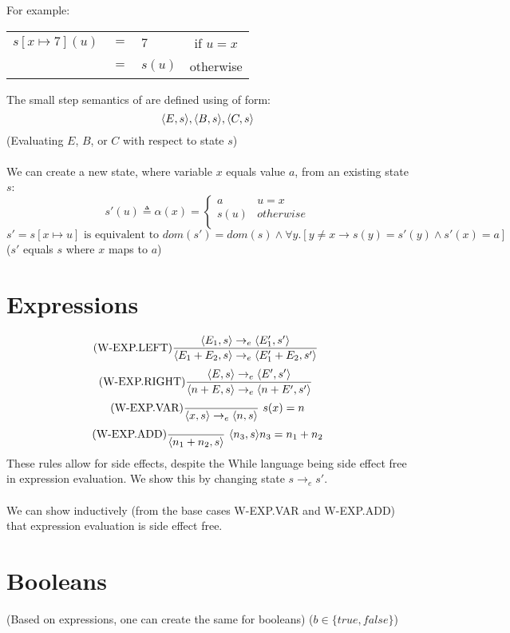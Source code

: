 \documentclass{report}
\begin{document}
        For example:
        \begin{center}
            \begin{tabular}{r c l c}
                $s[x \mapsto 7](u)$ & $=$ & $7$ & if $u = x$ \\
                & $=$ & $s(u)$ & otherwise \\
            \end{tabular}
        \end{center}
        The small step semantics of  are defined using  of form:
        \[\langle E, s \rangle, \langle B, s \rangle, \langle C, s \rangle \]
        (Evaluating $E$, $B$, or $C$ with respect to state $s$)
        \\
        \\ We can create a new state, where variable $x$ equals value $a$, from an existing state $s$:
        \[s'(u) \triangleq \alpha(x)=\begin{cases}
            a & u = x \\
            s(u) & otherwise \\
         \end{cases}\]
        \[s' = s[x \mapsto u] \text{ is equivalent to } dom(s') = dom(s) \land \forall y.[y \neq x \rightarrow s(y) = s'(y) \land s'(x) = a]\]
        ($s'$ equals $s$ where $x$ maps to $a$)
    
    \section*{Expressions}
        \[\text{(W-EXP.LEFT)}\dfrac{\langle E_1, s \rangle \to_e \langle E'_1, s' \rangle}{\langle E_1 + E_2, s \rangle \to_e \langle E'_1 + E_2, s' \rangle} \ \]
        \[\text{(W-EXP.RIGHT)}\dfrac{\langle E, s \rangle \to_e \langle E', s' \rangle}{\langle n+E, s \rangle \to_e \langle n + E', s' \rangle} \ \]
        \[\text{(W-EXP.VAR)}\dfrac{}{\langle x, s \rangle \to_e \langle n, s \rangle} \ s(x) = n\]
        \[\text{(W-EXP.ADD)}\dfrac{}{\langle n_1 + n_2, s \rangle} \ \langle n_3, s \rangle{n_3 = n_1 + n_2}\]
        These rules allow for side effects, despite the While language being side effect free in expression evaluation. We show this by changing state $s \to_e s'$.
        \\
        \\ We can show inductively (from the base cases W-EXP.VAR and W-EXP.ADD) that expression evaluation is side effect free.
    \section*{Booleans}
        (Based on expressions, one can create the same for booleans) ($b \in \{true, false\}$)
\end{document}
